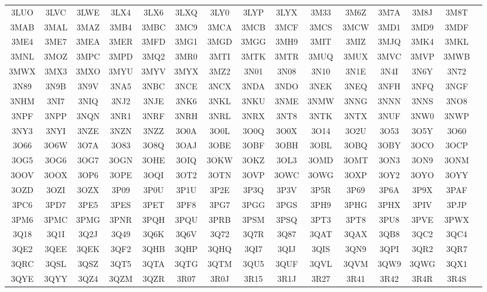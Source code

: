 \begin{longtable}{ c c c c c c c c c c c c c c c }
	3LUO & 3LVC & 3LWE & 3LX4 & 3LX6 & 3LXQ & 3LY0 & 3LYP & 3LYX & 3M33 & 3M6Z & 3M7A & 3M8J & 3M8T  \\
	3MAB & 3MAL & 3MAZ & 3MB4 & 3MBC & 3MC9 & 3MCA & 3MCB & 3MCF & 3MCS & 3MCW & 3MD1 & 3MD9 & 3MDF  \\
	3ME4 & 3ME7 & 3MEA & 3MER & 3MFD & 3MG1 & 3MGD & 3MGG & 3MH9 & 3MIT & 3MIZ & 3MJQ & 3MK4 & 3MKL  \\
	3MNL & 3MOZ & 3MPC & 3MPD & 3MQ2 & 3MR0 & 3MTI & 3MTK & 3MTR & 3MUQ & 3MUX & 3MVC & 3MVP & 3MWB  \\
	3MWX & 3MX3 & 3MXO & 3MYU & 3MYV & 3MYX & 3MZ2 & 3N01 & 3N08 & 3N10 & 3N1E & 3N4I & 3N6Y & 3N72  \\
	3N89 & 3N9B & 3N9V & 3NA5 & 3NBC & 3NCE & 3NCX & 3NDA & 3NDO & 3NEK & 3NEQ & 3NFH & 3NFQ & 3NGF  \\
	3NHM & 3NI7 & 3NIQ & 3NJ2 & 3NJE & 3NK6 & 3NKL & 3NKU & 3NME & 3NMW & 3NNG & 3NNN & 3NNS & 3NO8  \\
	3NPF & 3NPP & 3NQN & 3NR1 & 3NRF & 3NRH & 3NRL & 3NRX & 3NT8 & 3NTK & 3NTX & 3NUF & 3NW0 & 3NWP  \\
	3NY3 & 3NYI & 3NZE & 3NZN & 3NZZ & 3O0A & 3O0L & 3O0Q & 3O0X & 3O14 & 3O2U & 3O53 & 3O5Y & 3O60  \\
	3O66 & 3O6W & 3O7A & 3O83 & 3O8Q & 3OAJ & 3OBE & 3OBF & 3OBH & 3OBL & 3OBQ & 3OBY & 3OCO & 3OCP  \\
	3OG5 & 3OG6 & 3OG7 & 3OGN & 3OHE & 3OIQ & 3OKW & 3OKZ & 3OL3 & 3OMD & 3OMT & 3ON3 & 3ON9 & 3ONM  \\
	3OOV & 3OOX & 3OP6 & 3OPE & 3OQI & 3OT2 & 3OTN & 3OVP & 3OWC & 3OWG & 3OXP & 3OY2 & 3OYO & 3OYY  \\
	3OZD & 3OZI & 3OZX & 3P09 & 3P0U & 3P1U & 3P2E & 3P3Q & 3P3V & 3P5R & 3P69 & 3P6A & 3P9X & 3PAF  \\
	3PC6 & 3PD7 & 3PE5 & 3PES & 3PET & 3PF8 & 3PG7 & 3PGG & 3PGS & 3PH9 & 3PHG & 3PHX & 3PIV & 3PJP  \\
	3PM6 & 3PMC & 3PMG & 3PNR & 3PQH & 3PQU & 3PRB & 3PSM & 3PSQ & 3PT3 & 3PT8 & 3PU8 & 3PVE & 3PWX  \\
	3Q18 & 3Q1I & 3Q2J & 3Q49 & 3Q6K & 3Q6V & 3Q72 & 3Q7R & 3Q87 & 3QAT & 3QAX & 3QB8 & 3QC2 & 3QC4  \\
	3QE2 & 3QEE & 3QEK & 3QF2 & 3QHB & 3QHP & 3QHQ & 3QI7 & 3QIJ & 3QIS & 3QN9 & 3QPI & 3QR2 & 3QR7  \\
	3QRC & 3QSL & 3QSZ & 3QT5 & 3QTA & 3QTG & 3QTM & 3QU5 & 3QUF & 3QVL & 3QVM & 3QW9 & 3QWG & 3QX1  \\
	3QYE & 3QYY & 3QZ4 & 3QZM & 3QZR & 3R07 & 3R0J & 3R15 & 3R1J & 3R27 & 3R41 & 3R42 & 3R4R & 3R4S  \\

\end{longtable}
